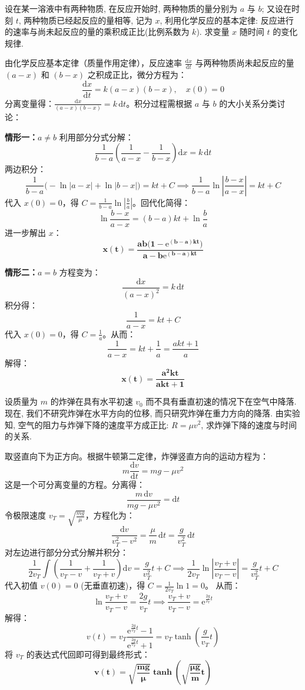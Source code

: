 \documentclass[lang=cn,11pt]{elegantbook}
\begin{document}
\begin{exercise}[实际应用题]
设在某一溶液中有两种物质, 在反应开始时, 两种物质的量分别为 $a$ 与 $b$; 又设在时刻 $t$, 两种物质已经起反应的量相等, 记为 $x$, 利用化学反应的基本定律: 反应进行的速率与尚未起反应的量的乘积成正比(比例系数为 $k$). 求变量 $x$ 随时间 $t$ 的变化规律.
\end{exercise}
\begin{solution}
由化学反应基本定律（质量作用定律），反应速率 $\frac{\mathrm{d}x}{\mathrm{d}t}$ 与两种物质尚未起反应的量 $(a-x)$ 和 $(b-x)$ 之积成正比，微分方程为：
\[
\frac{\mathrm{d}x}{\mathrm{d}t} = k(a-x)(b-x), \quad x(0)=0
\]
分离变量得：$\frac{\mathrm{d}x}{(a-x)(b-x)} = k\,\mathrm{d}t$。积分过程需根据 $a$ 与 $b$ 的大小关系分类讨论：

\textbf{情形一：$a \neq b$}
利用部分分式分解：
\[
\frac{1}{b-a}\left(\frac{1}{a-x} - \frac{1}{b-x}\right)\mathrm{d}x = k\,\mathrm{d}t
\]
两边积分：
\[
\frac{1}{b-a}\big(-\ln|a-x| + \ln|b-x|\big) = kt + C \implies \frac{1}{b-a}\ln\left|\frac{b-x}{a-x}\right| = kt + C
\]
代入 $x(0)=0$，得 $C = \frac{1}{b-a}\ln\left|\frac{b}{a}\right|$。回代化简得：
\[
\ln\frac{b-x}{a-x} = (b-a)kt + \ln\frac{b}{a}
\]
进一步解出 $x$：
\[
\mathbf{x(t) = \frac{ab\big(1-\mathrm{e}^{(b-a)kt}\big)}{a - b\mathrm{e}^{(b-a)kt}}}
\]

\textbf{情形二：$a = b$}
方程变为：
\[
\frac{\mathrm{d}x}{(a-x)^2} = k\,\mathrm{d}t
\]
积分得：
\[
\frac{1}{a-x} = kt + C
\]
代入 $x(0)=0$，得 $C = \frac{1}{a}$。从而：
\[
\frac{1}{a-x} = kt + \frac{1}{a} = \frac{akt+1}{a}
\]
解得：
\[
\mathbf{x(t) = \frac{a^2kt}{akt+1}}
\]
\end{solution}

\begin{exercise}[实际应用题]
设质量为 $m$ 的炸弹在具有水平初速 $v_0$ 而不具有垂直初速的情况下在空气中降落. 现在, 我们不研究炸弹在水平方向的位移, 而只研究炸弹在重力方向的降落. 由实验知, 空气的阻力与炸弹下降的速度平方成正比: $R=\mu v^2$, 求炸弹下降的速度与时间的关系.
\end{exercise}
\begin{solution}
取竖直向下为正方向。根据牛顿第二定律，炸弹竖直方向的运动方程为：
\[
m\frac{\mathrm{d}v}{\mathrm{d}t} = mg - \mu v^2
\]
这是一个可分离变量的方程。分离得：
\[
\frac{m\,\mathrm{d}v}{mg - \mu v^2} = \mathrm{d}t
\]
令极限速度 $v_T = \sqrt{\frac{mg}{\mu}}$，方程化为：
\[
\frac{\mathrm{d}v}{v_T^2 - v^2} = \frac{\mu}{m}\,\mathrm{d}t = \frac{g}{v_T^2}\,\mathrm{d}t
\]
对左边进行部分分式分解并积分：
\[
\frac{1}{2v_T}\int \left(\frac{1}{v_T - v} + \frac{1}{v_T + v}\right)\mathrm{d}v = \frac{g}{v_T^2}t + C \implies \frac{1}{2v_T}\ln\left|\frac{v_T+v}{v_T-v}\right| = \frac{g}{v_T^2}t + C
\]
代入初值 $v(0)=0$ (无垂直初速)，得 $C = \frac{1}{2v_T}\ln 1 = 0$。
从而：
\[
\ln\frac{v_T+v}{v_T-v} = \frac{2g}{v_T}t \implies \frac{v_T+v}{v_T-v} = \mathrm{e}^{\frac{2g}{v_T}t}
\]
解得：
\[
v(t) = v_T\frac{\mathrm{e}^{\frac{2g}{v_T}t}-1}{\mathrm{e}^{\frac{2g}{v_T}t}+1} = v_T\tanh\left(\frac{g}{v_T}t\right)
\]
将 $v_T$ 的表达式代回即可得到最终形式：
\[
\mathbf{v(t) = \sqrt{\frac{mg}{\mu}}\tanh\left(\sqrt{\frac{\mu g}{m}}t\right)}
\]
\end{solution}
\end{document}

